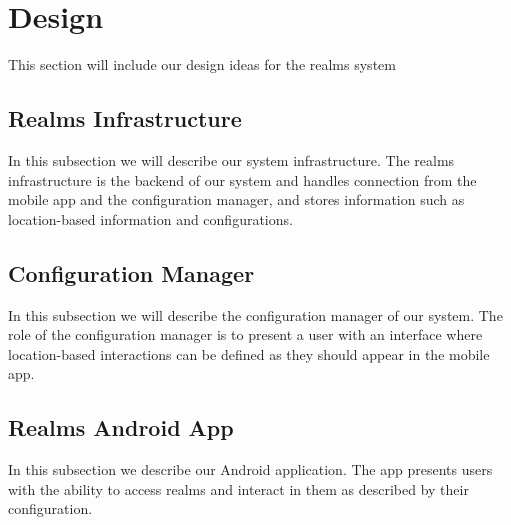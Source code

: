 \section{Design} %
\label{sec:design}
This section will include our design ideas for the realms system

\subsection{Realms Infrastructure} %
\label{sub:realms_infrastructure}
In this subsection we will describe our system infrastructure. The realms infrastructure is the backend of our system and handles connection from the mobile app and the configuration manager, and stores information such as location-based information and configurations.

\subsection{Configuration Manager} %
\label{sub:configuration_manager}
In this subsection we will describe the configuration manager of our system. The role of the configuration manager is to present a user with an interface where location-based interactions can be defined as they should appear in the mobile app. 

\subsection{Realms Android App} %
\label{sub:realms_android_app}
In this subsection we describe our Android application. The app presents users with the ability to access realms and interact in them as described by their configuration.
